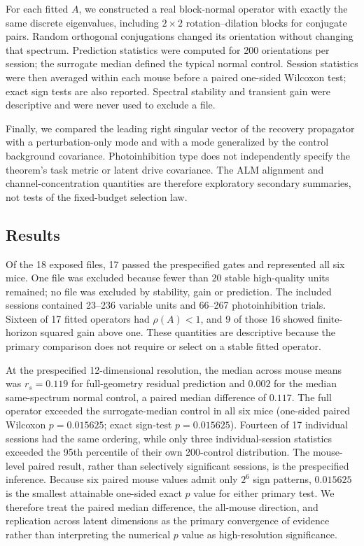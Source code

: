 \documentclass[
  aps,prl,preprint,notitlepage,superscriptaddress,nofootinbib,longbibliography,
  amsmath,amssymb
]{revtex4-2}
\begin{document}
For each fitted $A$, we constructed a real block-normal operator with exactly
the same discrete eigenvalues, including $2\times2$ rotation--dilation blocks
for conjugate pairs.  Random orthogonal conjugations changed its orientation
without changing that spectrum.  Prediction statistics were computed for 200
orientations per session; the surrogate median defined the typical normal
control.  Session statistics were then averaged within each mouse before a
paired one-sided Wilcoxon test; exact sign tests are also reported.  Spectral stability
and transient gain were descriptive and were never used to exclude a file.

Finally, we compared the leading right singular vector of the recovery
propagator with a perturbation-only mode and with a mode generalized by the
control background covariance.  Photoinhibition type does not independently
specify the theorem's task metric or latent drive covariance.  The ALM
alignment and channel-concentration
quantities are therefore exploratory secondary summaries, not tests of the
fixed-budget selection law.

\subsection{Results}

Of the 18 exposed files, 17 passed the prespecified gates and represented all
six mice.  One file was excluded because fewer than 20 stable high-quality
units remained; no file was excluded by stability, gain or prediction.  The
included sessions contained 23--236 variable units and 66--267
photoinhibition trials.  Sixteen of 17 fitted operators had $\rho(A)<1$, and 9
of those 16 showed finite-horizon squared gain above one.  These quantities are
descriptive because the primary comparison does not require or select on a
stable fitted operator.

At the prespecified 12-dimensional resolution, the median across mouse means
was $r_s=0.119$ for full-geometry residual prediction and $0.002$ for the
median same-spectrum normal control, a paired median difference of $0.117$.
The full operator exceeded the surrogate-median control in all six mice (one-sided paired
Wilcoxon $p=0.015625$; exact sign-test $p=0.015625$).  Fourteen of 17 individual
sessions had the same ordering, while only three individual-session statistics
exceeded the 95th percentile of their own 200-control distribution.  The
mouse-level paired result, rather than selectively significant sessions, is the
prespecified inference.  Because six paired mouse values admit only $2^6$
sign patterns, $0.015625$ is the smallest attainable one-sided exact $p$ value
for either primary test.  We therefore treat the paired median difference, the
all-mouse direction, and replication across latent dimensions as the primary
convergence of evidence rather than interpreting the numerical $p$ value as
high-resolution significance.
\end{document}
